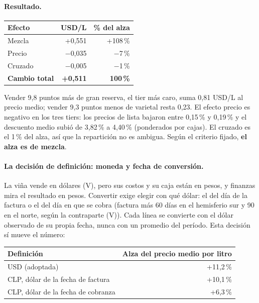 \paragraph{Resultado.}

\begin{center}
\small
\begin{tabular}{l r r}
\hline
\textbf{Efecto} & \textbf{USD/L} & \textbf{\% del alza} \\
\hline
Mezcla & +0,551 & +108\,\% \\
Precio & $-$0,035 & $-$7\,\% \\
Cruzado & $-$0,005 & $-$1\,\% \\
\hline
\textbf{Cambio total} & \textbf{+0,511} & \textbf{100\,\%} \\
\hline
\end{tabular}
\end{center}

\noindent Vender 9,8 puntos más de gran reserva, el tier más caro, suma 0,81 USD/L al precio medio; vender 9,3 puntos menos de varietal resta 0,23. El efecto precio es negativo en los tres tiers: los precios de lista bajaron entre 0,15\,\% y 0,19\,\% y el descuento medio subió de 3,82\,\% a 4,40\,\% (ponderados por cajas). El cruzado es el 1\,\% del alza, así que la repartición no es ambigua. Según el criterio fijado, \textbf{el alza es de mezcla}.

\paragraph{La decisión de definición: moneda y fecha de conversión.}\label{par:fecha_dolar} La viña vende en dólares (V), pero sus costos y su caja están en pesos, y finanzas mira el resultado en pesos. Convertir exige elegir con qué dólar: el del día de la factura o el del día en que se cobra (factura más 60 días en el hemisferio sur y 90 en el norte, según la contraparte (V)). Cada línea se convierte con el dólar observado de su propia fecha, nunca con un promedio del período. Esta decisión sí mueve el número:

\begin{center}
\small
\renewcommand{\arraystretch}{1.15}
\begin{tabular}{@{}l r@{}}
\toprule
\textbf{Definición} & \textbf{Alza del precio medio por litro} \\
\midrule
USD (adoptada) & +11,2\,\% \\
CLP, dólar de la fecha de factura & +10,1\,\% \\
CLP, dólar de la fecha de cobranza & +6,3\,\% \\
\bottomrule
\end{tabular}
\end{center}


